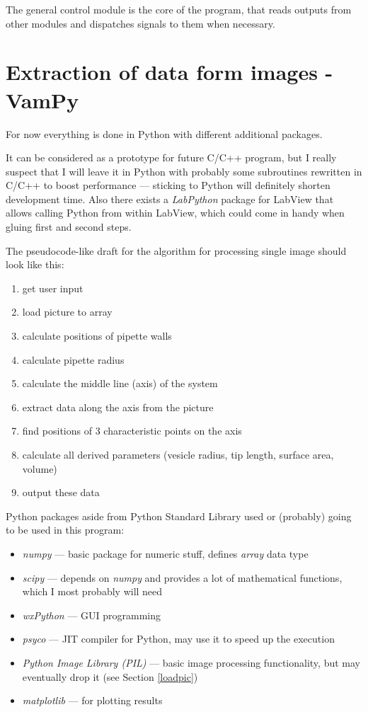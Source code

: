 The general control module is the core of the program, that reads outputs from other modules and dispatches signals to them when necessary.


\section{Extraction of data form images - VamPy}\label{data}

For now everything is done in Python with different additional packages.

It can be considered as a prototype for future C/C++ program, but I really suspect that I will leave it in Python with probably some subroutines rewritten in C/C++ to boost performance --- sticking to Python will definitely shorten development time. Also there exists a \emph{LabPython} package for LabView that allows calling Python from within LabView, which could come in handy when gluing first and second steps.

The pseudocode-like draft for the algorithm for processing single image should look like this:
\begin{enumerate}
  \item get user input
  \item load picture to array
  \item calculate positions of pipette walls
  \item calculate pipette radius
  \item calculate the middle line (axis) of the system
  \item extract data along the axis from the picture
  \item find positions of 3 characteristic points on the axis
  \item calculate all derived parameters (vesicle radius, tip length, surface area, volume)
  \item output these data
\end{enumerate}

Python packages aside from Python Standard Library used or (probably) going to be used in this program:
\begin{itemize}
	\item \emph{numpy} --- basic package for numeric stuff, defines \emph{array} data type
	\item \emph{scipy} --- depends on \emph{numpy} and provides a lot of mathematical functions, which I most probably will need \cite{scipy}
	\item \emph{wxPython} --- GUI programming
	\item \emph{psyco} --- JIT compiler for Python, may use it to speed up the execution
	\item \emph{Python Image Library (PIL)} --- basic image processing functionality, but may eventually drop it (see Section \ref{loadpic})
	\item \emph{matplotlib} --- for plotting results
\end{itemize}

